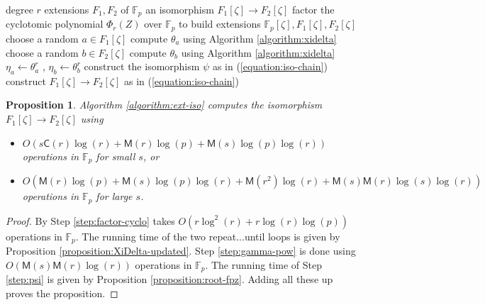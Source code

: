 \documentclass[12pt]{article}
\theoremstyle{plain}
\newtheorem{proposition}[theorem]{Proposition}
\theoremstyle{definition}
\def\F{\mathbb{F}}
\def\M{\mathsf{M}}
\def\CC{\mathsf{C}}
\newcounter{algorithm}
\begin{document}
\begin{algorithm}
\label{algorithm:ext-iso}
	\begin{algorithmic}[1]
		\REQUIRE degree $r$ extensions $F_1, F_2$ of $\F_p$
		\ENSURE an isomorphism $F_1[\zeta] \rightarrow F_2[\zeta]$
		\STATE\label{step:factor-cyclo} factor the cyclotomic polynomial $\Phi_r(Z)$ over $\F_p$ to build extensions $\F_p[\zeta],
F_1[\zeta], F_2[\zeta]$
		\REPEAT
			\STATE choose a random $a \in F_1[\zeta]$
			\STATE compute $\theta_a$ using Algorithm \ref{algorithm:xidelta}
		\REPEAT
			\STATE choose a random $b \in F_2[\zeta]$
			\STATE compute $\theta_b$ using Algorithm \ref{algorithm:xidelta}
		\STATE\label{step:gamma-pow} $\eta_a \leftarrow \theta_a^r$ , $\eta_b \leftarrow \theta_b^r$
		\STATE\label{step:psi} construct the isomorphism $\psi$ as in (\ref{equation:iso-chain})
		\STATE construct $F_1[\zeta] \rightarrow F_2[\zeta]$ as in (\ref{equation:iso-chain})
	\end{algorithmic}
\end{algorithm}

\begin{proposition}
	Algorithm \ref{algorithm:ext-iso} computes the isomorphism $F_1[\zeta] \rightarrow F_2[\zeta]$ using
	\begin{itemize}
		\item $O(s\CC(r)\log(r) + \M(r)\log(p) + \M(s)\log(p)\log(r))$\\ operations in $\F_p$ for small $s$, or
		\item $O(\M(r)\log(p) + \M(s)\log(p)\log(r) + \M(r^2)\log(r) + \M(s)\M(r)\log(s)\log(r))$\\ operations in $\F_p$ for large $s$.
	\end{itemize}
\end{proposition}
\begin{proof}
By \cite[Theorem 9]{shoup1994fast} Step \ref{step:factor-cyclo} takes $O(r\log^2(r) + r\log(r)\log(p))$ operations in $\F_p$. The
running time of the two repeat...until loops is given by Proposition \ref{proposition:XiDelta-updated}. Step \ref{step:gamma-pow}
is done using $O(\M(s)\M(r)\log(r))$ operations in $\F_p$. The running time of Step \ref{step:psi} is given by Proposition
\ref{proposition:root-fpz}. Adding all these up proves the proposition.
\end{proof}
\end{document}
